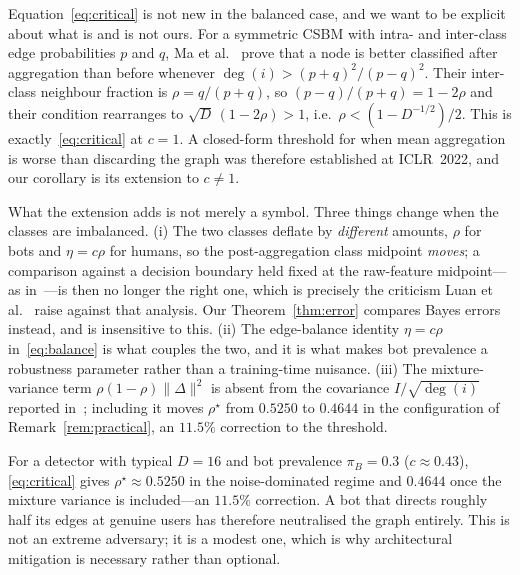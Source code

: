 \documentclass[../elsevier.tex]{subfiles}
\begin{document}
\begin{remark}[Relation to Ma et al.]
\label{rem:ma}
Equation~\eqref{eq:critical} is not new in the balanced case, and we want to be
explicit about what is and is not ours. For a symmetric CSBM with intra- and
inter-class edge probabilities $p$ and $q$, Ma et al.~\citeyearpar[Thm.~2]{ma2022homophily}
prove that a node is better classified after aggregation than before whenever
$\deg(i) > (p+q)^2/(p-q)^2$. Their inter-class neighbour fraction is
$\rho = q/(p+q)$, so $(p-q)/(p+q) = 1-2\rho$ and their condition rearranges to
$\sqrt{D}\,(1-2\rho) > 1$, i.e.\ $\rho < (1 - D^{-1/2})/2$. This is
exactly~\eqref{eq:critical} at $c = 1$. A closed-form threshold for when mean
aggregation is worse than discarding the graph was therefore established at
ICLR~2022, and our corollary is its extension to $c \neq 1$.

What the extension adds is not merely a symbol. Three things change when the classes
are imbalanced. (i) The two classes deflate by \emph{different} amounts, $\rho$ for
bots and $\eta = c\rho$ for humans, so the post-aggregation class midpoint
\emph{moves}; a comparison against a decision boundary held fixed at the raw-feature
midpoint---as in~\citep{ma2022homophily}---is then no longer the right one, which is
precisely the criticism Luan et al.~\citeyearpar{luan2023when} raise against that
analysis. Our Theorem~\ref{thm:error} compares Bayes errors instead, and is
insensitive to this. (ii) The edge-balance identity $\eta = c\rho$
in~\eqref{eq:balance} is what couples the two, and it is what makes bot
prevalence a robustness parameter rather than a training-time nuisance. (iii) The
mixture-variance term $\rho(1-\rho)\|\Delta\|^2$ is absent from the covariance
$I/\sqrt{\deg(i)}$ reported in~\citep{ma2022homophily}; including it moves
$\rho^\star$ from $0.5250$ to $0.4644$ in the configuration of
Remark~\ref{rem:practical}, an $11.5\%$ correction to the threshold.
\end{remark}

\begin{remark}
\label{rem:practical}
For a detector with typical $D = 16$ and bot prevalence $\pi_B = 0.3$
($c \approx 0.43$), \eqref{eq:critical} gives $\rho^\star \approx 0.5250$ in the
noise-dominated regime and $0.4644$ once the mixture variance is included---an
$11.5\%$ correction. A bot that
directs roughly half its edges at genuine users has therefore neutralised the graph
entirely. This is not an extreme adversary; it is a modest one, which is why
architectural mitigation is necessary rather than optional.
\end{remark}
\end{document}
